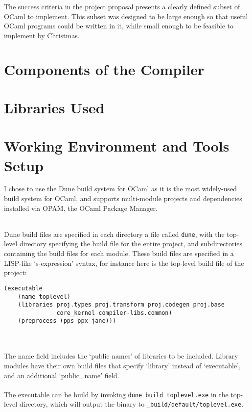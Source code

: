 \documentclass[12pt,twoside,notitlepage]{report}
\newcommand{\textinline}{\texttt}
\begin{document}
The success criteria in the project proposal presents a clearly defined subset of OCaml to implement. This subset was designed to be large enough so that useful OCaml programs could be written in it, while small enough to be feasible to implement by Christmas.




\section{Components of the Compiler}


\section{Libraries Used}


\section{Working Environment and Tools Setup}
I chose to use the Dune\cite{Dune} build system for OCaml as it is the most widely-used build system for OCaml, and supports multi-module projects and dependencies installed via OPAM, the OCaml Package Manager.
\\\\

\begin{minipage}{\linewidth}
Dune build files are specified in each directory a file called \textinline{dune}, with the top-level directory specifying the build file for the entire project, and subdirectories containing the build files for each module. These build files are specified in a LISP-like `s-expression' syntax, for instance here is the top-level build file of the project:
\begin{verbatim}
(executable
    (name toplevel)
    (libraries proj.types proj.transform proj.codegen proj.base
               core_kernel compiler-libs.common)
    (preprocess (pps ppx_jane)))
\end{verbatim}
\end{minipage}
\\\\
The name field includes the `public names' of libraries to be included. Library modules have their own build files that specify `library' instead of `executable', and an additional `public\_name' field.
\\\\
The executable can be build by invoking \textinline{dune build toplevel.exe} in the top-level directory, which will output the binary to \textinline{_build/default/toplevel.exe}.
\end{document}
